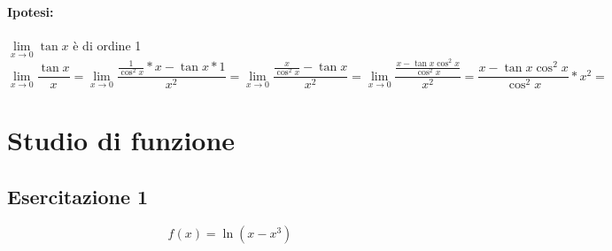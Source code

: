 \paragraph{Ipotesi:} $\lim\limits_{x\to0}\tan x$ è di ordine 1
\begin{equation}
	\lim_{x\to0}\frac{\tan x}{x}=\lim_{x\to0}\frac{\frac{1}{\cos^2x}*x-\tan x*1}{x^2}=\lim_{x\to0}\frac{\frac{x}{\cos^2x}-\tan x}{x^2}=\lim_{x\to0}\frac{\frac{x-\tan x \cos^2x}{\cos^2x}}{x^2}=\frac{x-\tan x \cos^2x}{\cos^2x}*x^2=
\end{equation}

\section{Studio di funzione}
\subsection{Esercitazione 1}
\begin{equation}
	f(x)=\ln\left(x-x^3\right)
\end{equation}
